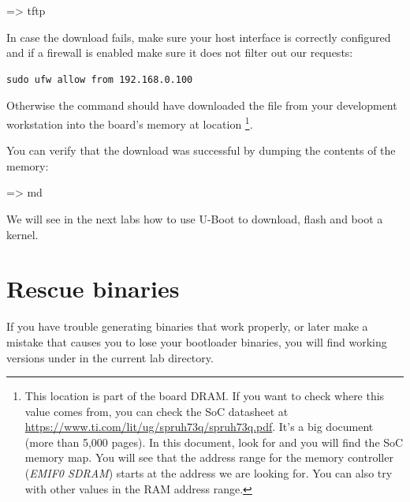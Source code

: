 \begin{ubootinput}
=> tftp %
\end{ubootinput}

In case the download fails, make sure your host interface is correctly
configured and if a firewall is enabled make sure it does not filter out our
requests:
\begin{verbatim}
sudo ufw allow from 192.168.0.100
\end{verbatim}

Otherwise the  command should have downloaded the
 file from your development workstation into
the board's memory at location {\tt \zimageboardaddr}\footnote{
This location is part of the board DRAM. If you want
to check where this value comes from, you can check the SoC
datasheet at
\url{https://www.ti.com/lit/ug/spruh73q/spruh73q.pdf}.
It's a big document (more than 5,000 pages). In this document, look
for  and you will find the SoC memory map.
You will see that the address range for the memory controller
({\em EMIF0 SDRAM})
starts at the address we are looking for.
You can also try with other values in the RAM address range.}.

You can verify that the download was successful by dumping the
contents of the memory:

\begin{ubootinput}
=> md %
\end{ubootinput}

We will see in the next labs how to use U-Boot to download, flash and
boot a kernel.


\section{Rescue binaries}

If you have trouble generating binaries that work properly, or later
make a mistake that causes you to lose your bootloader binaries, you
will find working versions under  in the current lab
directory.
